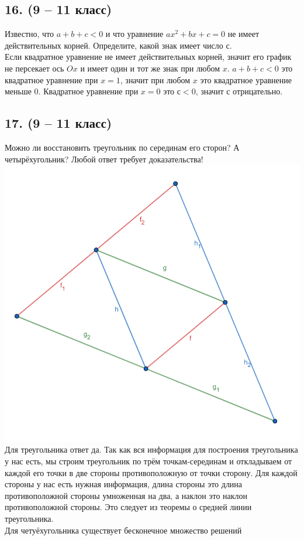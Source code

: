 \documentclass[a4paper,12pt]{article} %
\begin{document}
	\subsection*{16. (9 – 11 класс)}{Известно, что $a + b + c < 0$ и что уравнение $ax^2+bx+c=0$ не имеет действительных корней. Определите, какой знак имеет число $с$.\\
		
		Если квадратное уравнение не имеет действительных корней, значит его график не персекает ось $Ox$ и имеет один и тот же знак при любом $x$. $a + b + c < 0$ это квадратное уравнение при $x=1$, значит при любом $x$ это квадратное уравнение меньше $0$. Квадратное уравнение при $x=0$ это $с<0$, значит с отрицательно.
}
	\subsection*{17. (9 – 11 класс)}{Можно ли восстановить треугольник по серединам его сторон? А четырёхугольник? Любой ответ требует доказательства!\\
	\includegraphics[scale=0.5]{"Triangle Task 17"}\\
	Для треугольника ответ да. Так как вся информация для построения треугольника у нас есть, мы строим треугольник по трём точкам-серединам и откладываем от каждой его точки в две стороны противоположную от точки сторону. Для каждой стороны у нас есть нужная информация, длина стороны это длина противоположной стороны умноженная на два, а наклон это наклон противоположной стороны. Это следует из теоремы о средней линии треугольника.\\
	
	Для четуёхугольника существует бесконечное множество решений\\
	
	}
	
\end{document}
